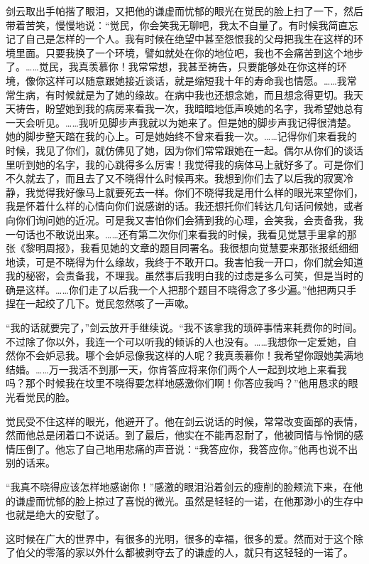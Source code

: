\par 剑云取出手帕揩了眼泪，又把他的谦虚而忧郁的眼光在觉民的脸上扫了一下，然后带着苦笑，慢慢地说：“觉民，你会笑我无聊吧，我太不自量了。有时候我简直忘记了自己是怎样的一个人。我有时候在绝望中甚至怨恨我的父母把我生在这样的环境里面。只要我换了一个环境，譬如就处在你的地位吧，我也不会痛苦到这个地步了。……觉民，我真羡慕你！我常常想，我甚至祷告，只要能够处在你这样的环境，像你这样可以随意跟她接近谈话，就是缩短我十年的寿命我也情愿。……我常常生病，有时候就是为了她的缘故。在病中我也还想念她，而且想念得更切。我天天祷告，盼望她到我的病房来看我一次，我暗暗地低声唤她的名字，我希望她总有一天会听见。……我听见脚步声我就以为她来了。但是她的脚步声我记得很清楚。她的脚步整天踏在我的心上。可是她始终不曾来看我一次。……记得你们来看我的时候，我见了你们，就仿佛见了她，因为你们常常跟她在一起。偶尔从你们的谈话里听到她的名字，我的心跳得多么厉害！我觉得我的病体马上就好多了。可是你们不久就去了，而且去了又不晓得什么时候再来。我想到你们去了以后我的寂寞冷静，我觉得我好像马上就要死去一样。你们不晓得我是用什么样的眼光来望你们，我是怀着什么样的心情向你们说感谢的话。我还想托你们转达几句话问候她，或者向你们询问她的近况。可是我又害怕你们会猜到我的心理，会笑我，会责备我，我一句话也不敢说出来。……还有第二次你们来看我的时候，我看见觉慧手里拿的那张《黎明周报》，我看见她的文章的题目同署名。我很想向觉慧要来那张报纸细细地读，可是不晓得为什么缘故，我终于不敢开口。我害怕我一开口，你们就会知道我的秘密，会责备我，不理我。虽然事后我明白我的过虑是多么可笑，但是当时的确是这样。……你们走了以后我一个人把那个题目不晓得念了多少遍。”他把两只手捏在一起绞了几下。觉民忽然咳了一声嗽。
\par “我的话就要完了，”剑云放开手继续说。“我不该拿我的琐碎事情来耗费你的时间。不过除了你以外，我连一个可以听我的倾诉的人也没有。……我想你一定爱她，自然你不会妒忌我。哪个会妒忌像我这样的人呢？我真羡慕你！我希望你跟她美满地结婚。……万一我活不到那一天，你肯答应将来你们两个人一起到坟地上来看我吗？那个时候我在坟里不晓得要怎样地感激你们啊！你答应我吗？”他用恳求的眼光看觉民的脸。
\par 觉民受不住这样的眼光，他避开了。他在剑云说话的时候，常常改变面部的表情，然而他总是闭着口不说话。到了最后，他实在不能再忍耐了，他被同情与怜悯的感情压倒了。他忘了自己地用悲痛的声音说：“我答应你，我答应你。”他再也说不出别的话来。
\par “我真不晓得应该怎样地感谢你！”感激的眼泪沿着剑云的瘦削的脸颊流下来，在他的谦虚而忧郁的脸上掠过了喜悦的微光。虽然是轻轻的一诺，在他那渺小的生存中也就是绝大的安慰了。
\par 这时候在广大的世界中，有很多的光明，很多的幸福，很多的爱。然而对于这个除了伯父的零落的家以外什么都被剥夺去了的谦虚的人，就只有这轻轻的一诺了。


